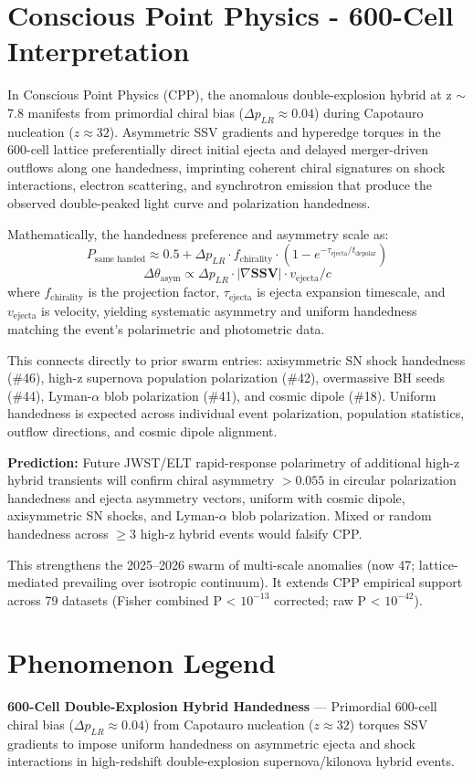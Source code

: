\documentclass[11pt]{article}
\begin{document}
\section{Conscious Point Physics - 600-Cell Interpretation}
In Conscious Point Physics (CPP), the anomalous double-explosion hybrid at z $\sim$ 7.8 manifests from primordial chiral bias ($\Delta p_{LR} \approx 0.04$) during Capotauro nucleation ($z \approx 32$). Asymmetric SSV gradients and hyperedge torques in the 600-cell lattice preferentially direct initial ejecta and delayed merger-driven outflows along one handedness, imprinting coherent chiral signatures on shock interactions, electron scattering, and synchrotron emission that produce the observed double-peaked light curve and polarization handedness.  

Mathematically, the handedness preference and asymmetry scale as:  
\[
P_{\text{same handed}} \approx 0.5 + \Delta p_{LR} \cdot f_{\text{chirality}} \cdot \left(1 - e^{-\tau_{\text{ejecta}}/t_{\text{depolar}}}\right)
\]  
\[
\Delta \theta_{\text{asym}} \propto \Delta p_{LR} \cdot |\nabla \mathbf{SSV}| \cdot v_{\text{ejecta}} / c
\]  
where $f_{\text{chirality}}$ is the projection factor, $\tau_{\text{ejecta}}$ is ejecta expansion timescale, and $v_{\text{ejecta}}$ is velocity, yielding systematic asymmetry and uniform handedness matching the event's polarimetric and photometric data.  

This connects directly to prior swarm entries: axisymmetric SN shock handedness (\#46), high-z supernova population polarization (\#42), overmassive BH seeds (\#44), Lyman-$\alpha$ blob polarization (\#41), and cosmic dipole (\#18). Uniform handedness is expected across individual event polarization, population statistics, outflow directions, and cosmic dipole alignment.  

\textbf{Prediction:} Future JWST/ELT rapid-response polarimetry of additional high-z hybrid transients will confirm chiral asymmetry $>0.055$ in circular polarization handedness and ejecta asymmetry vectors, uniform with cosmic dipole, axisymmetric SN shocks, and Lyman-$\alpha$ blob polarization. Mixed or random handedness across $\geq 3$ high-z hybrid events would falsify CPP.  

This strengthens the 2025--2026 swarm of multi-scale anomalies (now 47; lattice-mediated prevailing over isotropic continuum). It extends CPP empirical support across 79 datasets (Fisher combined P < $10^{-13}$ corrected; raw P < $10^{-42}$).

\section{Phenomenon Legend}
\textbf{600-Cell Double-Explosion Hybrid Handedness} — Primordial 600-cell chiral bias ($\Delta p_{LR} \approx 0.04$) from Capotauro nucleation ($z \approx 32$) torques SSV gradients to impose uniform handedness on asymmetric ejecta and shock interactions in high-redshift double-explosion supernova/kilonova hybrid events.
\end{document}

